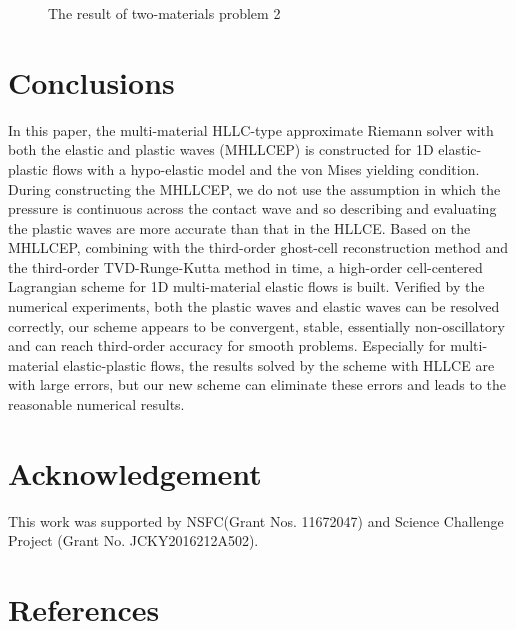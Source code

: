 \documentclass[review]{elsarticle}
\begin{document}
\begin{figure}

      \caption{ The result of two-materials  problem 2}
      \label{fig:multi2}
    \end{figure}

\section*{Conclusions}
In this paper,  the multi-material HLLC-type  approximate Riemann solver with both the elastic and plastic waves (MHLLCEP) is constructed for 1D elastic-plastic  flows with a hypo-elastic model and the von Mises yielding condition. During constructing the  MHLLCEP, we do not use the assumption in which the pressure is continuous across the contact wave and so describing and evaluating the plastic waves are  more accurate than that in the  HLLCE.  Based on the MHLLCEP, 
combining with the third-order ghost-cell reconstruction method and the third-order TVD-Runge-Kutta method in time, a high-order cell-centered Lagrangian scheme for 1D multi-material elastic flows is built. Verified by the numerical experiments, both the plastic waves and elastic waves can be resolved correctly, our scheme appears to be convergent, stable, essentially non-oscillatory and can reach third-order accuracy for smooth problems. Especially for multi-material elastic-plastic flows, the results solved by the scheme with HLLCE are with large errors, but our new scheme can eliminate these errors and leads to the reasonable numerical results.

%
\section*{Acknowledgement}
This work was supported by NSFC(Grant Nos. 11672047) and Science Challenge Project (Grant No. JCKY2016212A502).


\section*{References}



\newpage
  \appendix
  \renewcommand{\appendixname}{Appendix~}
\end{document}
